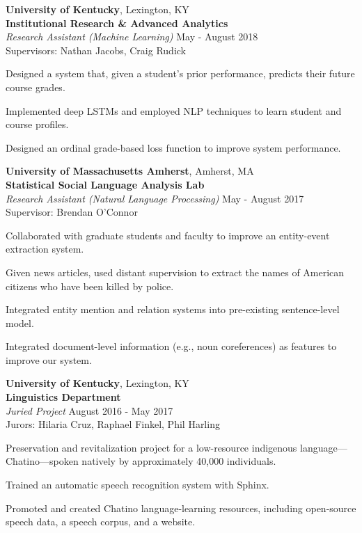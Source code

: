 \documentclass[10pt]{article}
\newcommand{\halfblankline}{\quad\vspace{-0.5\baselineskip}\pagebreak[3]}
\begin{document}
	\halfblankline

	{\textbf{University of Kentucky}},
	Lexington, KY\\
	\textbf{Institutional Research \& Advanced Analytics}\\
		\textit{Research Assistant (Machine Learning)}
		\hfill May - August 2018\\
		Supervisors: Nathan Jacobs, Craig Rudick
		\begin{innerlist}
			\item Designed a system that, given a student's prior performance,
			predicts their future course grades.
			\item Implemented deep LSTMs and employed NLP techniques to learn student and
			course profiles.
			\item Designed an ordinal grade-based loss function to improve system performance.
		\end{innerlist}

	\halfblankline

	{\textbf{University of Massachusetts Amherst}},
	Amherst, MA\\
	\textbf{Statistical Social Language Analysis Lab}\\
		\textit{Research Assistant (Natural Language Processing)}%
		\hfill May - August 2017\\
		Supervisor: Brendan O'Connor
		\begin{innerlist}
			\item Collaborated with graduate students and faculty to improve an entity-event extraction system.
			\item Given news articles, used distant supervision to extract the names of American citizens who have been killed by police.
			\item Integrated entity mention and relation systems into pre-existing sentence-level model.
			\item Integrated document-level information (e.g., noun coreferences) as features to improve our system.
		\end{innerlist}
	
	\halfblankline
	
	{\textbf{University of Kentucky}},
	Lexington, KY\\
	\textbf{Linguistics Department}\\
		\textit{Juried Project}%
		\hfill August 2016 - May 2017\\
		Jurors: Hilaria Cruz, Raphael Finkel, Phil Harling
		\begin{innerlist}
			\item Preservation and revitalization project for a low-resource indigenous language---Chatino---spoken natively by approximately 40,000 individuals.
			\item Trained an automatic speech recognition system with Sphinx.
			\item Promoted and created Chatino language-learning resources, including open-source speech data, a speech corpus, and a website.
		\end{innerlist}
	
\end{document}
